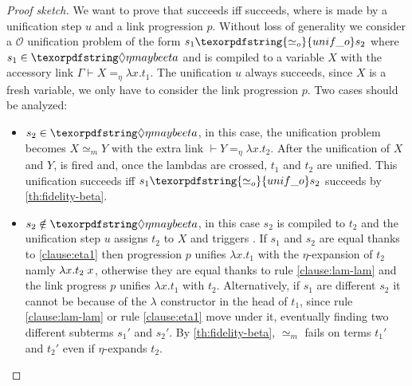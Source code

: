 \documentclass[sigconf,natbib=false,review]{acmart}
\newcommand{\appsep}{\ensuremath{\textcolor{lightgray}{\cdot}}}
\newcommand{\UnifRel}{\ensuremath{\simeq}}
\newcommand{\Uo}{\texorpdfstring{\ensuremath{\UnifRel_o}\xspace}{unif\_o}}
\newcommand{\Ue}{\ensuremath{\UnifRel_m}\xspace}
\newcommand{\Fo}{\texorpdfstring{\ensuremath{\mathcal{O}}\xspace}{O}}
\newcommand{\linketaM}[3]{\ensuremath{#1 \vdash #2 =_\eta #3}}
\newcommand{\linkStore}{\texorpdfstring{\ensuremath{\mathbb{L}}\xspace}{L}}
\newcommand{\hoUnifPb}{\ensuremath{\mathbb{Q}}\xspace}
\begin{document}
\begin{proof}[Proof sketch] %
  We want to prove that \fstep succeeds iff \hstep
  succeeds, where \hstep is made by a unification step $u$ and a link
  progression $p$.
  Without loss of generality we consider a
  \Fo{} unification problem of the form $s_1 \Uo s_2$
  where $s_1 \in \maybeeta$ and is compiled to a variable $X$ with the accessory link
  $\linketaM{\Gamma}{X}{\lambda x.t_1}$. 
  The unification $u$ always succeeds, since $X$ is a fresh variable, we 
  only have to consider the link progression $p$.
  Two cases should be analyzed:
  \begin{itemize}
    \item $s_2 \in \maybeeta$, in this case, the unification problem becomes $X \Ue Y$ 
          with the extra link $\linketaM{}{Y}{\lambda x.t_2}$. After the unification of 
          $X$ and $Y$, \progressetadedup is fired and, once the lambdas are crossed,
          $t_1$ and $t_2$ are unified. 
          This unification succeeds iff $s_1 \Uo s_2$ succeeds by \cref{th:fidelity-beta}.


    \item $s_2 \notin \maybeeta$,
          in this case $s_2$ is compiled to $t_2$ and the unification step $u$ assigns $t_2$ to $X$
          and triggers \progressetaleft.
          If $s_1$ and $s_2$ are equal thanks to \ref{clause:eta1} then
          progression $p$ unifies $\lambda x.t_1$ with the $\eta$-expansion of $t_2$ namly
          $\lambda x.t_2\appsep x$, otherwise they are equal thanks to rule \ref{clause:lam-lam}
          and the link progress $p$ unifies $\lambda x.t_1$ with $t_2$.
          Alternatively, if $s_1$ are different $s_2$
          it cannot be because of the $\lambda$ constructor in the head of $t_1$,
          since rule \ref{clause:lam-lam} or rule \ref{clause:eta1} move under it, eventually finding two
          different subterms $s_1'$ and $s_2'$. By \cref{th:fidelity-beta},
          \Ue fails on terms $t_1'$ and $t_2'$ even if \progressetaleft
          $\eta$-expands $t_2$.


\end{itemize}
\end{proof}
\end{document}
